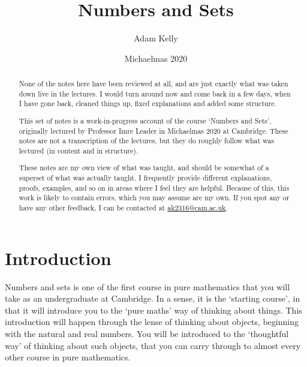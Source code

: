\documentclass[a4]{scrartcl}
\title{Numbers and Sets}
\author{Adam Kelly}
\date{Michaelmas 2020}
\begin{document}
\maketitle

\begin{abstract}\vspace{2\baselineskip}
	{\color{red} None of the notes here have been reviewed at all, and are just exactly what was taken down live in the lectures. I would turn around now and come back in a few days, when I have gone back, cleaned things up, fixed explanations and added some structure.}
	\vspace{5\baselineskip}



	This set of notes is a work-in-progress account of the course `Numbers and Sets', originally lectured by Professor Imre Leader in Michaelmas 2020 at Cambridge. These notes are not a transcription of the lectures, but they do roughly follow what was lectured (in content and in structure).

	These notes are my own view of what was taught, and should be somewhat of a superset of what was actually taught. I frequently provide different explanations, proofs, examples, and so on in areas where I feel they are helpful. Because of this, this work is likely to contain errors, which you may assume are my own. If you spot any or have any other feedback, I can be contacted at \href{mailto:ak2316@cam.ac.uk}{ak2316@cam.ac.uk}.


\end{abstract}

\tableofcontents

\clearpage
\section{Introduction}

Numbers and sets is one of the first course in pure mathematics that you will take
as an undergraduate at Cambridge. In a sense, it is the `starting course', in that it will introduce you to the `pure maths' way of thinking about things. 
This introduction will happen through the lense of thinking about objects, beginning with the natural and real numbers. You will be introduced to the `thoughtful way' of thinking about such objects, that you can carry through to almost every other course in pure mathematics.
\end{document}
